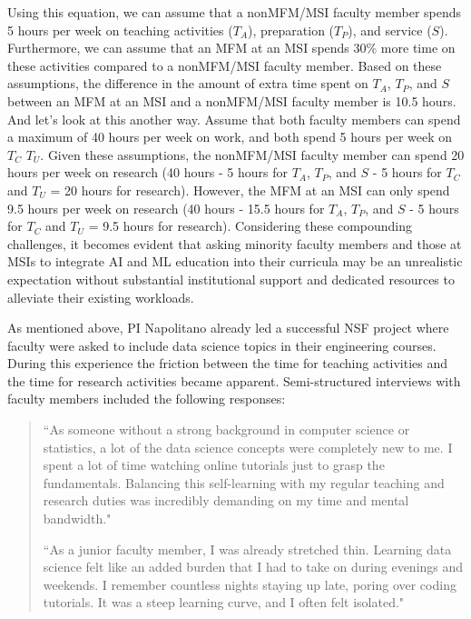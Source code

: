 \documentclass[11pt]{article}
\begin{document}
Using this equation, we can assume that a nonMFM/MSI faculty member spends 5 hours per week on teaching activities ($T_A$), preparation ($T_P$), and service ($S$). Furthermore, we can assume that an MFM at an MSI spends 30\% more time on these activities compared to a nonMFM/MSI faculty member. Based on these assumptions, the difference in the amount of extra time spent on $T_A$, $T_P$, and $S$ between an MFM at an MSI and a nonMFM/MSI faculty member is 10.5 hours.
And let's look at this another way. 
Assume that both faculty members can spend a maximum of 40 hours per week on work, and both spend 5 hours per week on $T_C$ $T_U$. 
Given these assumptions, the nonMFM/MSI faculty member can spend 20 hours per week on research (40 hours - 5 hours for $T_A$, $T_P$, and $S$ - 5 hours for $T_C$ and $T_U$ = 20 hours for research). However, the MFM at an MSI can only spend 9.5 hours per week on research (40 hours - 15.5 hours for $T_A$, $T_P$, and $S$ - 5 hours for $T_C$ and $T_U$ = 9.5 hours for research).
Considering these compounding challenges, it becomes evident that asking minority faculty members and those at MSIs to integrate AI and ML education into their curricula may be an unrealistic expectation without substantial institutional support and dedicated resources to alleviate their existing workloads.


As mentioned above, PI Napolitano already led a successful NSF project where faculty were asked to include data science topics in their engineering courses. 
During this experience the friction between the time for teaching activities and the time for research activities became apparent. Semi-structured interviews with faculty members included the following responses: 

\begin{quote}
``As someone without a strong background in computer science or statistics, a lot of the data science concepts were completely new to me. I spent a lot of time watching online tutorials just to grasp the fundamentals. Balancing this self-learning with my regular teaching and research duties was incredibly demanding on my time and mental bandwidth."

``As a junior faculty member, I was already stretched thin. Learning data science felt like an added burden that I had to take on during evenings and weekends. I remember countless nights staying up late, poring over coding tutorials. It was a steep learning curve, and I often felt isolated."

\end{quote}
\end{document}
